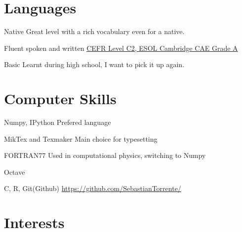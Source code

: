 \documentclass[11pt,a4paper,roman]{moderncv}
\begin{document}

\section{Languages}
	{Native}
	{Great level with a rich vocabulary even for a native.}

	{Fluent spoken and written}
	{\href{https://dl.dropbox.com/u/87894135/StatementOfResult.pdf}
	{CEFR Level C2, ESOL Cambridge CAE Grade A}}

	{Basic}
	{Learnt during high school, I want to pick it up again.}


\section{Computer Skills}

	{Numpy, IPython}
	{Prefered language}

\cvitemwithcomment{\LaTeX}
	{MikTex and Texmaker}
	{Main choice for typesetting}

	{FORTRAN77}
	{Used in computational physics, switching to Numpy}

	{Octave}
	{}

	{C, R, Git(Github)}
	{\href{https://github.com/SebastianTorrente/}
	{https://github.com/SebastianTorrente/}}




\section{Interests}
\end{document}
